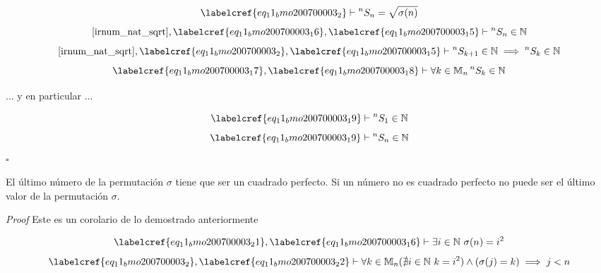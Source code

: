 \begin{equation} \label{eq_11_bmo200700003_16}
	\labelcref{eq_11_bmo200700003_2} \vdash \prescript{n}{}{S_n} = \sqrt{\sigma(n)}
\end{equation}
\begin{equation} \label{eq_11_bmo200700003_17}
	\cref{irnum_nat_sqrt}, \labelcref{eq_11_bmo200700003_16}, \labelcref{eq_11_bmo200700003_15} \vdash \prescript{n}{}{S_n} \in \mathbb{N}
\end{equation}
\begin{equation} \label{eq_11_bmo200700003_18}
	\cref{irnum_nat_sqrt}, \labelcref{eq_11_bmo200700003_2}, \labelcref{eq_11_bmo200700003_15} \vdash \prescript{n}{}{S_{k+1}} \in \mathbb{N} \implies \prescript{n}{}{S_{k}} \in \mathbb{N}
\end{equation}
\begin{equation} \label{eq_11_bmo200700003_19}
	\labelcref{eq_11_bmo200700003_17}, \labelcref{eq_11_bmo200700003_18} \vdash \forall k \in \mathbb{M}_n \prescript{n}{}{S_{k}} \in \mathbb{N}
\end{equation}

... y en particular ...

\begin{equation} \label{eq_11_bmo200700003_20}
	\labelcref{eq_11_bmo200700003_19} \vdash \prescript{n}{}{S_{1}} \in \mathbb{N}
\end{equation}
\begin{equation} \label{eq_11_bmo200700003_21}
	\labelcref{eq_11_bmo200700003_19} \vdash \prescript{n}{}{S_{n}} \in \mathbb{N}
\end{equation}
\hfill $\square$

\begin{claim}
	El último número de la permutación $\sigma$ tiene que ser un cuadrado perfecto. Si un número no es cuadrado perfecto no puede ser el último valor de la permutación $\sigma$.
\end{claim}

\textit{Proof} Este es un corolario de lo demostrado anteriormente

\begin{equation} \label{eq_11_bmo200700003_22}
	\labelcref{eq_11_bmo200700003_21}, \labelcref{eq_11_bmo200700003_16} \vdash \exists i \in \mathbb{N}\ \sigma(n) = i^2
\end{equation}
\begin{equation} \label{eq_11_bmo200700003_23}
	\labelcref{eq_11_bmo200700003_2}, \labelcref{eq_11_bmo200700003_22} \vdash \forall k \in \mathbb{M}_n (\nexists i \in \mathbb{N}\ k = i^2) \land (\sigma(j) = k) \implies j < n
\end{equation}

